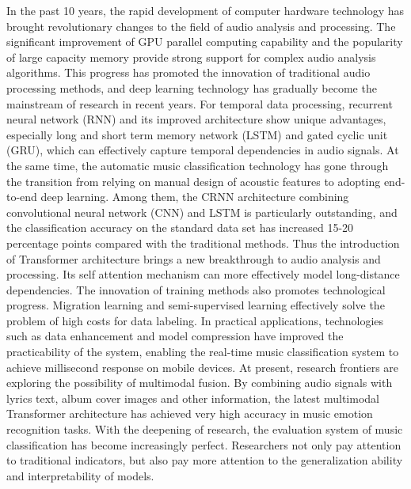 In the past 10 years, the rapid development of computer hardware technology has brought revolutionary changes to the field of audio analysis and processing. The significant improvement of GPU parallel computing capability and the popularity of large capacity memory provide strong support for complex audio analysis algorithms. This progress has promoted the innovation of traditional audio processing methods, and deep learning technology has gradually become the mainstream of research in recent years. For temporal data processing, recurrent neural network (RNN) and its improved architecture show unique advantages, especially long and short term memory network (LSTM) and gated cyclic unit (GRU), which can effectively capture temporal dependencies in audio signals. At the same time, the automatic music classification technology has gone through the transition from relying on manual design of acoustic features to adopting end-to-end deep learning. Among them, the CRNN architecture combining convolutional neural network (CNN) and LSTM is particularly outstanding, and the classification accuracy on the standard data set has increased 15-20 percentage points compared with the traditional methods. Thus the introduction of Transformer architecture brings a new breakthrough to audio analysis and processing. Its self attention mechanism can more effectively model long-distance dependencies. The innovation of training methods also promotes technological progress. Migration learning and semi-supervised learning effectively solve the problem of high costs for data labeling. In practical applications, technologies such as data enhancement and model compression have improved the practicability of the system, enabling the real-time music classification system to achieve millisecond response on mobile devices. At present, research frontiers are exploring the possibility of multimodal fusion. By combining audio signals with lyrics text, album cover images and other information, the latest multimodal Transformer architecture has achieved very high accuracy in music emotion recognition tasks. With the deepening of research, the evaluation system of music classification has become increasingly perfect. Researchers not only pay attention to traditional indicators, but also pay more attention to the generalization ability and interpretability of models.\\
\\
